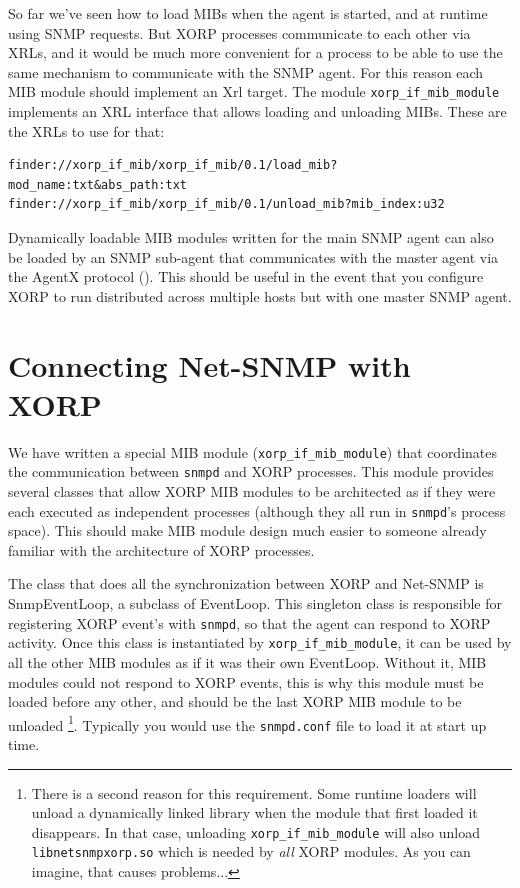 \documentclass[11pt]{article}
\begin{document}
So far we've seen how to load MIBs when the agent is started, and at runtime
using SNMP requests.  But XORP processes communicate to each other via XRLs, and
it would be much more convenient for a process to be able to use the same
mechanism to communicate with the SNMP agent.  For this reason each MIB module
should implement an Xrl target.  The module \texttt{xorp\_if\_mib\_module}
implements an XRL interface that allows loading and unloading MIBs.  These are
the XRLs to use for that: 

\begin{ttfamily}
\begin{verbatim}
finder://xorp_if_mib/xorp_if_mib/0.1/load_mib?mod_name:txt&abs_path:txt
finder://xorp_if_mib/xorp_if_mib/0.1/unload_mib?mib_index:u32
\end{verbatim}
\end{ttfamily}

Dynamically loadable MIB modules written for the main SNMP agent can also be
loaded by an SNMP sub-agent that communicates with the master agent via the
AgentX protocol (\cite{AgentX}).  This should be useful in the event that you
configure XORP to run distributed across multiple hosts but with one 
master SNMP agent.  


\section{Connecting Net-SNMP with XORP}


We have written a special MIB module (\texttt{xorp\_if\_mib\_module}) that
coordinates the communication between \texttt{snmpd} and XORP processes.  This
module provides several classes that allow XORP MIB modules to be architected
as if they were each executed as independent processes (although they all run
in \texttt{snmpd}'s process space).  This should make MIB module design much
easier to someone already familiar with the architecture of XORP processes.
 
The class that does all the synchronization between XORP and Net-SNMP 
is SnmpEventLoop, a subclass of EventLoop.  This singleton class is
responsible for registering XORP event's with \texttt{snmpd}, so that the agent
can respond to XORP activity.  Once this class is instantiated by
\texttt{xorp\_if\_mib\_module}, it can be used by all the other MIB modules as
if it was their own EventLoop.  Without it, MIB modules could not respond to
XORP events, this is why this module must be loaded before any other, and
should be the last XORP MIB module to be unloaded \footnote{There is a second
reason for this requirement.  Some runtime loaders will unload a dynamically
linked library when the module that first loaded it disappears.  In that case,
unloading \texttt{xorp\_if\_mib\_module} will also unload
\texttt{libnetsnmpxorp.so} which is needed by \emph{all} XORP modules.  As you
can imagine, that causes problems...}.  Typically you would use the
\texttt{snmpd.conf} file to load it at start up time.  
\end{document}
